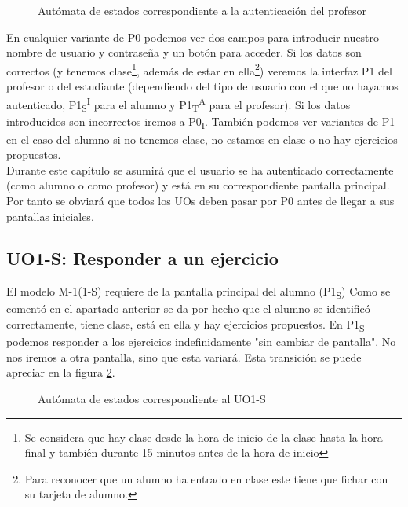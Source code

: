 \noindent
\begin{figure}[!htbp]
\noindent
{}
\caption{Autómata de estados correspondiente a la autenticación del profesor}
\label{fig:autenticacion-profesor}
\end{figure}

En cualquier variante de P0 podemos ver dos campos para introducir nuestro nombre de usuario y contraseña y un botón para acceder. Si los datos son correctos (y tenemos clase\footnote{Se considera que hay clase desde la hora de inicio de la clase hasta la hora final y también durante 15 minutos antes de la hora de inicio}, además de estar en ella\footnote{Para reconocer que un alumno ha entrado en clase este tiene que fichar con su tarjeta de alumno.}) veremos la interfaz P1 del profesor o del estudiante (dependiendo del tipo de usuario con el que no hayamos autenticado, P1\textsubscript{S}\textsuperscript{I} para el alumno y P1\textsubscript{T}\textsuperscript{A} para el profesor). Si los datos introducidos son incorrectos iremos a P0\textsubscript{I}. También podemos ver variantes de P1 en el caso del alumno si no tenemos clase, no estamos en clase o no hay ejercicios propuestos.\\

Durante este capítulo se asumirá que el usuario se ha autenticado correctamente (como alumno o como profesor) y está en su correspondiente pantalla principal. Por tanto se obviará que todos los UOs deben pasar por P0 antes de llegar a sus pantallas iniciales.\\

\subsection{UO1-S: Responder a un ejercicio}
\label{analisis-de-requisitos:funcionales:uo1s}

El modelo M-1(1-S) requiere de la pantalla principal del alumno (P1\textsubscript{S}) Como se comentó en el apartado anterior se da por hecho que el alumno se identificó correctamente, tiene clase, está en ella y hay ejercicios propuestos. En P1\textsubscript{S} podemos responder a los ejercicios indefinidamente "sin cambiar de pantalla". No nos iremos a otra pantalla, sino que esta variará. Esta transición se puede apreciar en la figura \ref{fig:analisis-de-requisitos:funcionales:uo1s}.\\

\noindent
\begin{figure}[!htbp]
\noindent
{}
\caption{Autómata de estados correspondiente al UO1-S}
\label{fig:analisis-de-requisitos:funcionales:uo1s}
\end{figure}

